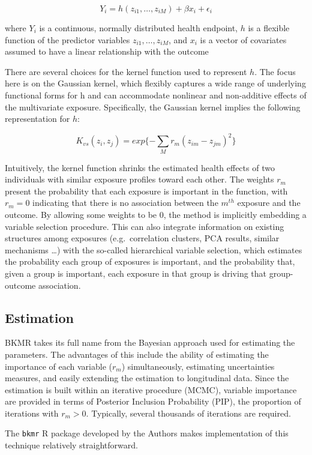 \documentclass[
]{book}
\begin{document}
\[Y_i=h(z_{i1},…,z_{iM})+βx_i+\epsilon_i\]

where \(Y_i\) is a continuous, normally distributed health endpoint, \(h\) is a flexible function of the predictor variables \(z_{i1},…,z_{iM}\), and \(x_i\) is a vector of covariates assumed to have a linear relationship with the outcome

There are several choices for the kernel function used to represent \(h\). The focus here is on the Gaussian kernel, which flexibly captures a wide range of underlying functional forms for h and can accommodate nonlinear and non-additive effects of the
multivariate exposure. Specifically, the Gaussian kernel implies the following representation for \(h\):

\[K_{vs}(z_i,z_j)=exp\{-\sum_{M}r_m(z_{im}-z_{jm})^2\}\]

Intuitively, the kernel function shrinks the estimated health effects of two individuals with similar exposure profiles toward each other. The weights \(r_m\) present the probability that each exposure is important in the function, with \(r_m=0\) indicating that there is no association between the \(m^{th}\) exposure and the outcome. By allowing some weights to be 0, the method is implicitly embedding a variable selection procedure. This can also integrate information on existing structures among exposures (e.g.~correlation clusters, PCA results, similar mechanisms \ldots) with the so-called hierarchical variable selection, which estimates the probability each group of exposures is important, and the probability that, given a group is important, each
exposure in that group is driving that group-outcome association.

\hypertarget{estimation}{%
\subsection{Estimation}\label{estimation}}

BKMR takes its full name from the Bayesian approach used for estimating the parameters. The advantages of this include the ability of estimating the importance of each variable (\(r_m\)) simultaneously, estimating uncertainties measures, and easily extending the estimation to longitudinal data. Since the estimation is built within an iterative procedure (MCMC), variable importance are provided in terms of Posterior Inclusion Probability (PIP), the proportion of iterations with \(r_m>0\). Typically, several thousands of iterations are required.

The \texttt{bkmr} R package developed by the Authors makes implementation of this technique relatively straightforward.
\end{document}
